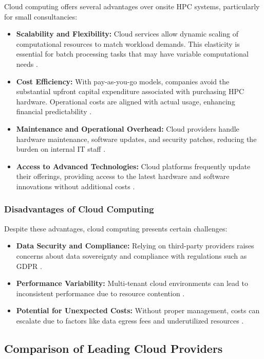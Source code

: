 \documentclass{article}
\begin{document}
Cloud computing offers several advantages over onsite HPC systems, particularly for small consultancies:
\begin{itemize}
    \item \textbf{Scalability and Flexibility:} Cloud services allow dynamic scaling of computational resources to match workload demands. This elasticity is essential for batch processing tasks that may have variable computational needs \parencite{armbrust2010cloud}.
    \item \textbf{Cost Efficiency:} With pay-as-you-go models, companies avoid the substantial upfront capital expenditure associated with purchasing HPC hardware. Operational costs are aligned with actual usage, enhancing financial predictability \parencite{li2019decision}.
    \item \textbf{Maintenance and Operational Overhead:} Cloud providers handle hardware maintenance, software updates, and security patches, reducing the burden on internal IT staff \parencite{marinescu2013cloud}.
    \item \textbf{Access to Advanced Technologies:} Cloud platforms frequently update their offerings, providing access to the latest hardware and software innovations without additional costs \parencite{dillon2010cloud}.
\end{itemize}

\subsubsection{Disadvantages of Cloud Computing}

Despite these advantages, cloud computing presents certain challenges:
\begin{itemize}
    \item \textbf{Data Security and Compliance:} Relying on third-party providers raises concerns about data sovereignty and compliance with regulations such as GDPR \parencite{hashem2015bigdata}.
    \item \textbf{Performance Variability:} Multi-tenant cloud environments can lead to inconsistent performance due to resource contention \parencite{leitner2016patterns}.
    \item \textbf{Potential for Unexpected Costs:} Without proper management, costs can escalate due to factors like data egress fees and underutilized resources \parencite{rehman2018cloud}.
\end{itemize}

\subsection{Comparison of Leading Cloud Providers}
\end{document}
